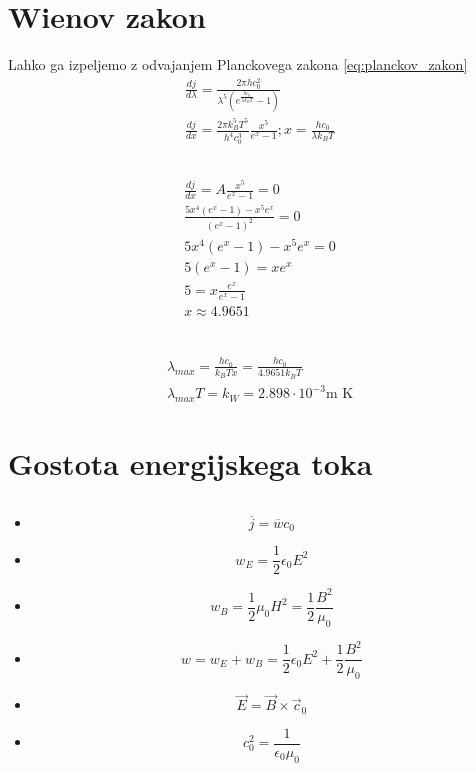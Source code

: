 \documentclass[a4paper,12pt]{article}
\begin{document}
\newpage
\section{Wienov zakon}
Lahko ga izpeljemo z odvajanjem Planckovega zakona \ref{eq:planckov_zakon}
\begin{align}
    \frac{dj}{d\lambda} = \frac{2 \pi hc_0^2}{\lambda^5\left(e^{\frac{hc_0}{\lambda k_B T}} - 1\right)} \\
    \frac{dj}{dx}= \frac{2 \pi k_B^5 T^5}{h^4 c_0^3} \frac{x^5}{e^x - 1}; x = \frac{hc_0}{\lambda k_B T}
\end{align}

\subsection{}
\begin{align}
    \frac{dj}{dx} = A \frac{x^5}{e^x - 1} = 0        \\
    \frac{5x^4 (e^x - 1) - x^5 e^x}{(e^x - 1)^2} = 0 \\
    5x^4 (e^x - 1) - x^5 e^x = 0                     \\
    5(e^x - 1) = x e^x                               \\
    5 = x \frac{e^x}{e^x - 1}                        \\
    x \approx 4.9651                                 \\
\end{align}

\subsection{}
\begin{align}
    \lambda_{max} = \frac{hc_0}{k_B T x} = \frac{hc_0}{4.9651 k_B T} \\
    \lambda_{max} T = k_W = 2.898 \cdot 10^{-3} \text{m K}
\end{align}

\newpage
\section{Gostota energijskega toka}
\subsection{}
\begin{itemize}[itemsep=-20pt]
    \item $$\overline{j} = \overline{w} c_0$$
    \item $$w_E = \frac{1}{2} \epsilon_0 E^2$$
    \item $$w_B = \frac{1}{2} \mu_0 H^2 = \frac{1}{2} \frac{B^2}{\mu_0}$$
    \item $$w = w_E + w_B = \frac{1}{2} \epsilon_0 E^2 + \frac{1}{2} \frac{B^2}{\mu_0}$$
    \item $$\vec E = \vec B \times \vec c_0$$
    \item $$c_0^2 = \frac{1}{\epsilon_0 \mu_0}$$
\end{itemize}
\end{document}
